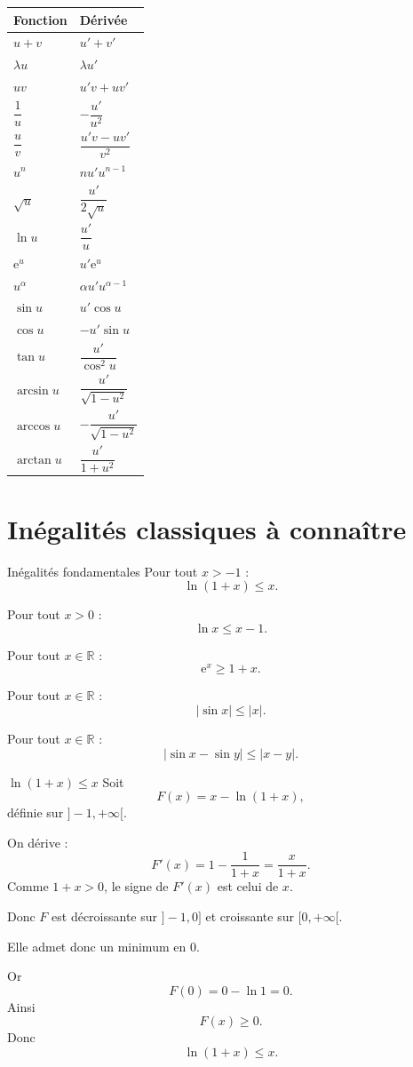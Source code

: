 \documentclass[11pt,a4paper]{article}
\newcommand{\R}{\mathbb{R}}
\newcommand{\e}{\mathrm{e}}
\begin{document}
\begin{center}
\renewcommand{\arraystretch}{1.7}
\begin{tabular}{|>{\centering\arraybackslash}m{6cm}|>{\centering\arraybackslash}m{7cm}|}
\hline
\textbf{Fonction} & \textbf{Dérivée} \\
\hline
$u+v$ & $u'+v'$ \\
\hline
$\lambda u$ & $\lambda u'$ \\
\hline
$uv$ & $u'v+uv'$ \\
\hline
$\dfrac1u$ & $-\dfrac{u'}{u^2}$ \\
\hline
$\dfrac uv$ & $\dfrac{u'v-uv'}{v^2}$ \\
\hline
$u^n$ & $nu'u^{n-1}$ \\
\hline
$\sqrt{u}$ & $\dfrac{u'}{2\sqrt{u}}$ \\
\hline
$\ln u$ & $\dfrac{u'}u$ \\
\hline
$\e^u$ & $u'\e^u$ \\
\hline
$u^\alpha$ & $\alpha u'u^{\alpha-1}$ \\
\hline
$\sin u$ & $u'\cos u$ \\
\hline
$\cos u$ & $-u'\sin u$ \\
\hline
$\tan u$ & $\dfrac{u'}{\cos^2u}$ \\
\hline
$\arcsin u$ & $\dfrac{u'}{\sqrt{1-u^2}}$ \\
\hline
$\arccos u$ & $-\dfrac{u'}{\sqrt{1-u^2}}$ \\
\hline
$\arctan u$ & $\dfrac{u'}{1+u^2}$ \\
\hline
\end{tabular}
\end{center}

\section{Inégalités classiques à connaître}

\begin{theorembox}{Inégalités fondamentales}
Pour tout $x>-1$ :
\[
\ln(1+x)\leq x.
\]

Pour tout $x>0$ :
\[
\ln x\leq x-1.
\]

Pour tout $x\in\R$ :
\[
\e^x\geq 1+x.
\]

Pour tout $x\in\R$ :
\[
|\sin x|\leq |x|.
\]

Pour tout $x\in\R$ :
\[
|\sin x-\sin y|\leq |x-y|.
\]
\end{theorembox}

\begin{proofbox}{$\ln(1+x)\leq x$}
Soit
\[
F(x)=x-\ln(1+x),
\]
définie sur $]-1,+\infty[$.

On dérive :
\[
F'(x)=1-\frac1{1+x}=\frac{x}{1+x}.
\]
Comme $1+x>0$, le signe de $F'(x)$ est celui de $x$.

Donc $F$ est décroissante sur $]-1,0]$ et croissante sur $[0,+\infty[$.

Elle admet donc un minimum en $0$.

Or
\[
F(0)=0-\ln1=0.
\]
Ainsi
\[
F(x)\geq0.
\]
Donc
\[
\ln(1+x)\leq x.
\]
\end{proofbox}
\end{document}

